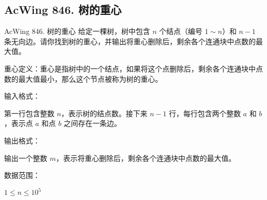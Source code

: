 \subsection{AcWing 846. 树的重心}
\begin{titledbox}{AcWing 846. 树的重心}
    给定一棵树，树中包含 $n$ 个结点（编号 $1 \sim n$）和 $n-1$ 条无向边。请你找到树的重心，并输出将重心删除后，剩余各个连通块中点数的最大值。

    重心定义：重心是指树中的一个结点，如果将这个点删除后，剩余各个连通块中点数的最大值最小，那么这个节点被称为树的重心。

    输入格式：

    第一行包含整数 $n$，表示树的结点数。接下来 $n-1$ 行，每行包含两个整数 $a$ 和 $b$，表示点 $a$ 和点 $b$ 之间存在一条边。

    输出格式：

    输出一个整数 $m$，表示将重心删除后，剩余各个连通块中点数的最大值。

    数据范围：

    $1 \le n \le 10^5$

    \begin{inputblock}
         \\
         \\
         \\
         \\
         \\
         \\
         \\
         \\
    \end{inputblock}
    \begin{outputblock}
    \end{outputblock}
\end{titledbox}


